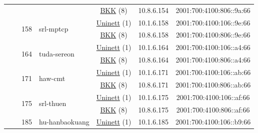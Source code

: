 \begin{small}
\begin{center}
\begin{longtable}{|c|c|c|c|c|c|c|c|}
  &  &  &  & \multicolumn{2}{|c|}{\tiny{\href{http://bkk.no}{BKK} (8)}} & \tiny{10.8.6.154} & \tiny{2001:700:4100:806::9a:66} \\* \cline{3-3}\cline{4-4}\cline{5-5}\cline{6-6}\cline{7-7}\cline{8-8}
  &  & \multirow{2}{*}{\tiny{158}} & \multicolumn{1}{|l|}{\multirow{2}{*}{\tiny{srl-mptcp}}} & \multicolumn{2}{|c|}{\tiny{\href{https://www.uninett.no}{Uninett} (1)}} & \tiny{10.1.6.158} & \tiny{2001:700:4100:106::9e:66} \\* \cline{5-5}\cline{6-6}\cline{7-7}\cline{8-8}
  &  &  &  & \multicolumn{2}{|c|}{\tiny{\href{http://bkk.no}{BKK} (8)}} & \tiny{10.8.6.158} & \tiny{2001:700:4100:806::9e:66} \\* \cline{3-3}\cline{4-4}\cline{5-5}\cline{6-6}\cline{7-7}\cline{8-8}
  &  & \multirow{2}{*}{\tiny{164}} & \multicolumn{1}{|l|}{\multirow{2}{*}{\tiny{tuda-sereon}}} & \multicolumn{2}{|c|}{\tiny{\href{https://www.uninett.no}{Uninett} (1)}} & \tiny{10.1.6.164} & \tiny{2001:700:4100:106::a4:66} \\* \cline{5-5}\cline{6-6}\cline{7-7}\cline{8-8}
  &  &  &  & \multicolumn{2}{|c|}{\tiny{\href{http://bkk.no}{BKK} (8)}} & \tiny{10.8.6.164} & \tiny{2001:700:4100:806::a4:66} \\* \cline{3-3}\cline{4-4}\cline{5-5}\cline{6-6}\cline{7-7}\cline{8-8}
  &  & \multirow{2}{*}{\tiny{171}} & \multicolumn{1}{|l|}{\multirow{2}{*}{\tiny{haw-cmt}}} & \multicolumn{2}{|c|}{\tiny{\href{https://www.uninett.no}{Uninett} (1)}} & \tiny{10.1.6.171} & \tiny{2001:700:4100:106::ab:66} \\* \cline{5-5}\cline{6-6}\cline{7-7}\cline{8-8}
  &  &  &  & \multicolumn{2}{|c|}{\tiny{\href{http://bkk.no}{BKK} (8)}} & \tiny{10.8.6.171} & \tiny{2001:700:4100:806::ab:66} \\* \cline{3-3}\cline{4-4}\cline{5-5}\cline{6-6}\cline{7-7}\cline{8-8}
  &  & \multirow{2}{*}{\tiny{175}} & \multicolumn{1}{|l|}{\multirow{2}{*}{\tiny{srl-thuen}}} & \multicolumn{2}{|c|}{\tiny{\href{https://www.uninett.no}{Uninett} (1)}} & \tiny{10.1.6.175} & \tiny{2001:700:4100:106::af:66} \\* \cline{5-5}\cline{6-6}\cline{7-7}\cline{8-8}
  &  &  &  & \multicolumn{2}{|c|}{\tiny{\href{http://bkk.no}{BKK} (8)}} & \tiny{10.8.6.175} & \tiny{2001:700:4100:806::af:66} \\* \cline{3-3}\cline{4-4}\cline{5-5}\cline{6-6}\cline{7-7}\cline{8-8}
  &  & \multirow{2}{*}{\tiny{185}} & \multicolumn{1}{|l|}{\multirow{2}{*}{\tiny{hu-hanbaokuang}}} & \multicolumn{2}{|c|}{\tiny{\href{https://www.uninett.no}{Uninett} (1)}} & \tiny{10.1.6.185} & \tiny{2001:700:4100:106::b9:66} \\* \cline{5-5}\cline{6-6}\cline{7-7}\cline{8-8}

\end{longtable}
\end{center}
\end{small}
